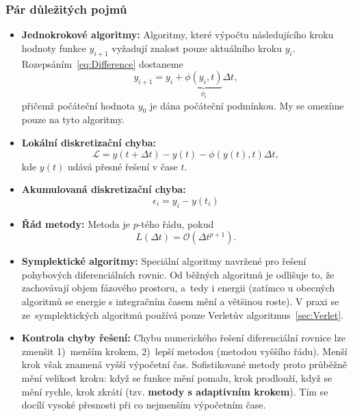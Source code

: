 \documentclass[a4paper,11pt,twoside]{article}
\begin{document}
    \subsubsection{Pár důležitých pojmů}
    \begin{itemize}
        \item {\bf Jednokrokové algoritmy:}
        Algoritmy, které výpočtu následujícího kroku hodnoty funkce $y_{i+1}$ vyžadují znalost pouze aktuálního kroku $y_{i}$.
        Rozepsáním~\eqref{eq:Difference} dostaneme
        \begin{equation}
            \boxed{
                y_{i+1}=y_{i}+\underbrace{\phi(y_{i},t)}_{\phi_{i}}\Delta t
            },
        \end{equation}
        přičemž počáteční hodnota $y_{0}$ je dána počáteční podmínkou.
        My se omezíme pouze na tyto algoritmy.

        \item {\bf Lokální diskretizační chyba:}
        \begin{equation}
            \mathcal{L}=y(t+\Delta t)-y(t)-\phi(y(t),t)\Delta t,
        \end{equation}        
        kde $y(t)$ udává přesné řešení v čase $t$.

        \item {\bf Akumulovaná diskretizační chyba:}
        \begin{equation}
            \epsilon_{i}=y_{i}-y(t_{i})
        \end{equation}

        \item {\bf Řád metody:} 
        Metoda je $p$-tého řádu, pokud
        \begin{equation}\label{eq:MethodOrder}
            L(\Delta t)=\mathcal{O}(\Delta t^{p+1}).
        \end{equation}

        \item {\bf Symplektické algoritmy:}
        Speciální algoritmy navržené pro řešení pohybových di\-fe\-ren\-ci\-ál\-ních rovnic.
        Od běžných algoritmů je odlišuje to, že zachovávají objem fázového prostoru, a~tedy i energii (zatímco u obecných algoritmů se energie s integračním časem mění a většinou roste).
        V praxi se ze~symplektických algoritmů používá pouze Verletův algoritmus~\ref{sec:Verlet}.

        \item {\bf Kontrola chyby řešení:}
        Chybu numerického řešení diferenciální rovnice lze zmenšit 1)~men\-ším krokem, 2)~lepší metodou (metodou vyššího řádu). 
        Menší krok však znamená vyšší vý\-po\-čet\-ní čas.
        Sofistikované metody proto průběžně mění velikost kroku: když se funkce mění pomalu, krok prodlouží, když se mění rychle, krok zkrátí (tzv. {\bf metody s adaptivním krokem}).
        Tím se docílí vysoké přesnosti při co nejmenším výpočetním čase.

    \end{itemize}
\end{document}
